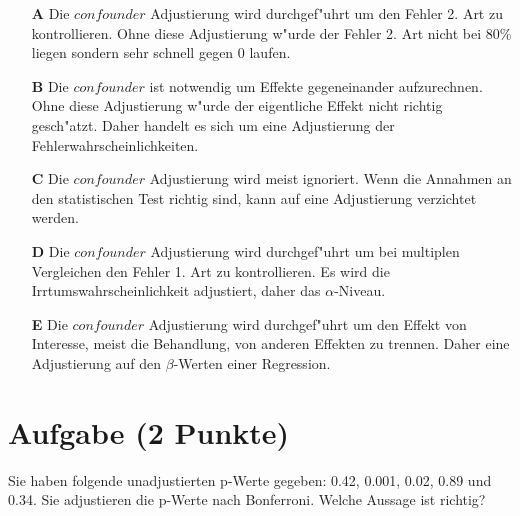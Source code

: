 \documentclass[a4paper, 10pt]{scrartcl}\usepackage[]{graphicx}\usepackage[]{xcolor}
\begin{document}
\begin{enumerate}
\item [\textbf{A} \msquare] Die $confounder$ Adjustierung wird durchgef{"u}hrt um den Fehler 2. Art zu kontrollieren. Ohne diese Adjustierung w{"u}rde der Fehler 2. Art nicht bei 80\% liegen sondern sehr schnell gegen 0 laufen.
\item [\textbf{B} \msquare] Die $confounder$ ist notwendig um Effekte gegeneinander aufzurechnen. Ohne diese Adjustierung w{"u}rde der eigentliche Effekt nicht richtig gesch{"a}tzt. Daher handelt es sich um eine Adjustierung der Fehlerwahrscheinlichkeiten.
\item [\textbf{C} \msquare] Die $confounder$ Adjustierung wird meist ignoriert. Wenn die Annahmen an den statistischen Test richtig sind, kann auf eine Adjustierung verzichtet werden.
\item [\textbf{D} \msquare] Die $confounder$ Adjustierung wird durchgef{"u}hrt um bei multiplen Vergleichen den Fehler 1. Art zu kontrollieren. Es wird die Irrtumswahrscheinlichkeit adjustiert, daher das $\alpha$-Niveau.
\item [\textbf{E} \msquare] Die $confounder$ Adjustierung wird durchgef{"u}hrt um den Effekt von Interesse, meist die Behandlung, von anderen Effekten zu trennen. Daher eine Adjustierung auf den $\beta$-Werten einer Regression.
\end{enumerate} 

\section{Aufgabe \hfill (2 Punkte)}



Sie haben folgende unadjustierten p-Werte gegeben: 0.42, 0.001, 0.02, 0.89 und 0.34. Sie adjustieren die p-Werte nach
Bonferroni. Welche Aussage ist richtig?
\end{document}
